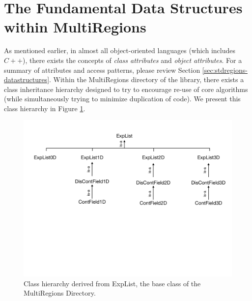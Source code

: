%
\section{The Fundamental Data Structures within MultiRegions}

As mentioned earlier, in almost all object-oriented languages (which includes $C++$), there exists the concepts of {\em class attributes} and {\em object attributes}.   For a summary of attributes and access patterns, please review Section \ref{sec:stdregions-datastructures}.
Within the MultiRegions directory of the library, there exists a class inheritance hierarchy designed to try to encourage re-use of core
algorithms (while simultaneously trying to minimize duplication of code).  We present this class hierarchy in Figure \ref{multiregions:multiregionstree}.


\begin{figure}[htb]
\centering
\includegraphics[width=6in]{img/multiregiontree.pdf}
\caption{Class hierarchy derived from ExpList, the base class of the MultiRegions Directory.}
\label{multiregions:multiregionstree}
\end{figure}

